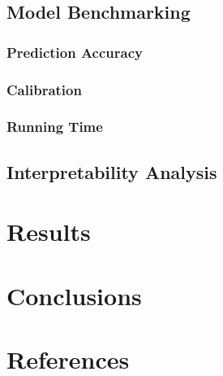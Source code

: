 \documentclass[
  a4paper,
]{scrreprt}
\begin{document}
\section{Model Benchmarking}\label{model-benchmarking}

\subsection{Prediction Accuracy}\label{prediction-accuracy}

\subsection{Calibration}\label{calibration}

\subsection{Running Time}\label{running-time}

\section{Interpretability Analysis}\label{interpretability-analysis}


\chapter{Results}\label{results}


\chapter{Conclusions}\label{conclusions}


\chapter*{References}\label{references}

\end{document}
